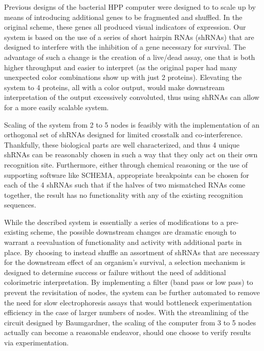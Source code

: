 \documentclass{article}
\begin{document}
Previous designs of the bacterial HPP computer were designed to to scale up by means of introducing additional genes to be fragmented and shuffled\cite{Baumgardner2009}. In the original scheme, these genes all produced visual indicators of expression. Our system is based on the use of a series of short hairpin RNAs (shRNAs) that are designed to interfere with the inhibition of a gene necessary for survival. The advantage of such a change is the creation of a live/dead assay, one that is both higher throughput and easier to interpret (as the original paper had many unexpected color combinations show up with just 2 proteins). Elevating the system to 4 proteins, all with a color output, would make downstream interpretation of the output excessively convoluted, thus using shRNAs can allow for a more easily scalable system.

Scaling of the system from 2 to 5 nodes is feasibly with the implementation of an orthogonal set of shRNAs designed for limited crosstalk and co-interference. Thankfully, these biological parts are well characterized, and thus 4 unique shRNAs can be reasonably chosen in such a way that they only act on their own recognition site. Furthermore, either through chemical reasoning or the use of supporting software like SCHEMA, appropriate breakpoints can be chosen for each of the 4 shRNAs such that if the halves of two mismatched RNAs come together, the result has no functionality with any of the existing recognition sequences.

While the described system is essentially a series of modifications to a pre-existing scheme, the possible downstream changes are dramatic enough to warrant a reevaluation of functionality and activity with additional parts in place. By choosing to instead shuffle an assortment of shRNAs that are necessary for the downstream effect of an organism’s survival, a selection mechanism is designed to determine success or failure without the need of additional colorimetric interpretation. By implementing a filter (band pass or low pass) to prevent the revisitation of nodes, the system can be further automated to remove the need for slow electrophoresis assays that would bottleneck experimentation efficiency in the case of larger numbers of nodes. With the streamlining of the circuit designed by Baumgardner, the scaling of the computer from 3 to 5 nodes actually can become a reasonable endeavor, should one choose to verify results via experimentation.

\printbibliography
\end{document}
